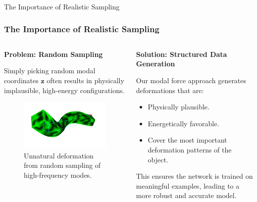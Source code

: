 \documentclass{beamer}
\begin{document}
\begin{frame}{The Importance of Realistic Sampling}
    \frametitle{The Importance of Realistic Sampling}
    
    \begin{columns}[T]
        \begin{column}{0.5\textwidth}
            \textbf{Problem: Random Sampling}
            
            Simply picking random modal coordinates \(\mathbf{z}\) often results in physically implausible, high-energy configurations.
            
            \begin{figure}
                \includegraphics[width=\textwidth]{Images/z_random.png}
                \caption{Unnatural deformation from random sampling of high-frequency modes.}
                \label{fig:bad_sampling}
            \end{figure}
        \end{column}
        
        \begin{column}{0.5\textwidth}
            \textbf{Solution: Structured Data Generation}
            
            Our modal force approach generates deformations that are:
            \begin{itemize}
                \item Physically plausible.
                \item Energetically favorable.
                \item Cover the most important deformation patterns of the object.
            \end{itemize}
            
            \vspace{2em}
            This ensures the network is trained on meaningful examples, leading to a more robust and accurate model.
        \end{column}
    \end{columns}
\end{frame}
\end{document}

